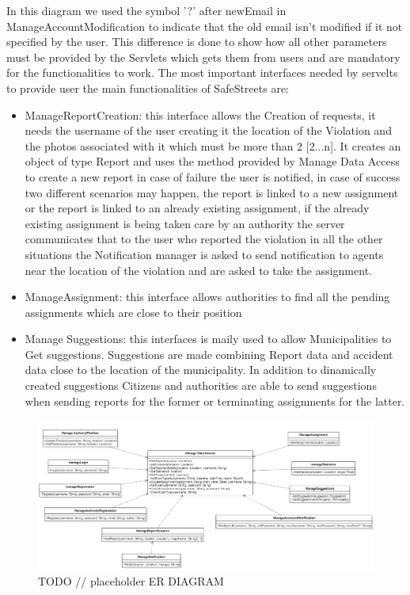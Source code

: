 In this diagram we used the symbol '?' after newEmail in ManageAccountModification to indicate that the old email isn't modified  if it not specified by the user. This difference is done to show how all other parameters must be provided by the Servlets which gets them from users and are mandatory for the functionalities to work.
The most important interfaces needed by servelts to provide user the main functionalities of SafeStreets are:
\begin{itemize}
\item ManageReportCreation: this interface allows the Creation of requests, it needs the username of the user creating it the location of the Violation and the photos associated with it which must be more than 2 [2...n]. It creates an object of type Report and uses the method provided by Manage Data Access to create a new report in case of failure the user is notified, in case of success two different scenarios may happen, the report is linked to a new assignment or the report is linked to an already existing assignment, if the already existing assignment is being taken care by an authority the server communicates that to the user who reported the violation in all the other situations the Notification manager is asked to send notification to agents near the location of the violation and are asked to take the assignment.
\item ManageAssignment: this interface allows authorities to find all the pending assignments which are close to their position
\item Manage Suggestions: this interfaces is maily used to allow Municipalities to Get suggestions. Suggestions are made combining Report data and accident data close to the location of the municipality. In addition to dinamically created suggestions Citizens and authorities are able to send suggestions when sending reports for the former or terminating assignments for the latter.
\end{itemize}
\begin{figure}[H]
\centering
\includegraphics[width=\textwidth]{Images/Interfaces.png}
\caption{\label{fig:ComWI}TODO // placeholder ER DIAGRAM }
\end{figure}
